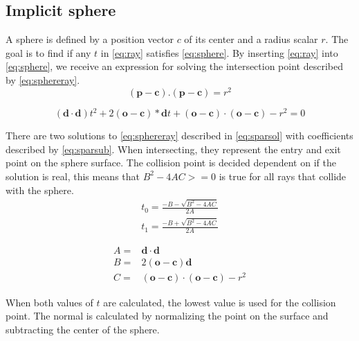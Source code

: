 \documentclass[a4paper, 12pt]{report}
\begin{document}
\subsection{Implicit sphere}
A sphere is defined by a position vector $c$ of its center and a radius scalar $r$. 
The goal is to find if any $t$ in \autoref{eq:ray} satisfies \autoref{eq:sphere}. 
By inserting \autoref{eq:ray} into \autoref{eq:sphere}, we receive an expression for solving the intersection point described by \autoref{eq:sphereray}.
\begin{equation} \label{eq:sphere}
(\mathbf{p} - \mathbf{c}).(\mathbf{p} - \mathbf{c}) = r^2
\end{equation}

\begin{equation} \label{eq:sphereray}
(\mathbf{d} \cdot \mathbf{d})t^2 + 2(\mathbf{o} - \mathbf{c}) * \mathbf{d} t + (\mathbf{o} - \mathbf{c}) \cdot (\mathbf{o} - \mathbf{c}) - r^2=0
\end{equation}

There are two solutions to \autoref{eq:sphereray} described in \autoref{eq:sparsol} with coefficients described by \autoref{eq:sparsub}.
When intersecting, they represent the entry and exit point on the sphere surface.
The collision point is decided dependent on if the solution is real, this means that $B^2 - 4 A C >= 0$ is true for all rays that collide with the sphere.
\begin{subequations} \label{eq:sparsol}
\begin{align} 
t_0 = \frac{ -B - \sqrt{B^2 - 4 A C} }{ 2 A }\\
t_1 = \frac{ -B + \sqrt{B^2 - 4 A C} }{ 2 A }
\end{align}
\end{subequations}

\begin{subequations} \label{eq:sparsub}
\begin{align}
A =& \mathbf{d} \cdot \mathbf{d} \\
B =& 2(\mathbf{o} - \mathbf{c}) \mathbf{d} \\
C =& (\mathbf{o} - \mathbf{c}) \cdot (\mathbf{o} - \mathbf{c}) - r^2
\end{align}
\end{subequations}

When both values of $t$ are calculated, the lowest value is used for the collision point. 
The normal is calculated by normalizing the point on the surface and subtracting the center of the sphere.
\end{document}
